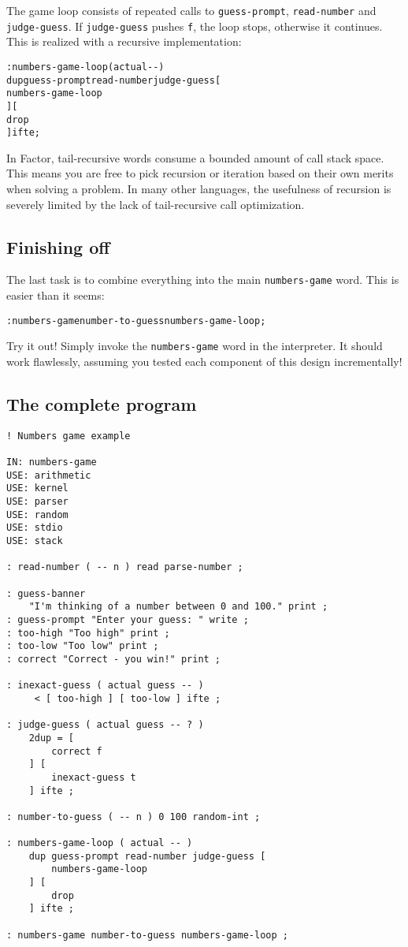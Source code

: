 \documentclass[english]{article}
\begin{document}
The game loop consists of repeated calls to \texttt{guess-prompt},
\texttt{read-number} and \texttt{judge-guess}. If \texttt{judge-guess}
pushes \texttt{f}, the loop stops, otherwise it continues. This is
realized with a recursive implementation:

\begin{alltt}
: numbers-game-loop ( actual -{}- )
    dup guess-prompt read-number judge-guess {[}
        numbers-game-loop
    {]} {[}
        drop
    {]} ifte ;
\end{alltt}
In Factor, tail-recursive words consume a bounded amount of call stack
space. This means you are free to pick recursion or iteration based
on their own merits when solving a problem. In many other languages,
the usefulness of recursion is severely limited by the lack of tail-recursive
call optimization.


\subsection{Finishing off}

The last task is to combine everything into the main \texttt{numbers-game}
word. This is easier than it seems:

\begin{alltt}
: numbers-game number-to-guess numbers-game-loop ;
\end{alltt}
Try it out! Simply invoke the \texttt{numbers-game} word in the interpreter.
It should work flawlessly, assuming you tested each component of this
design incrementally!


\subsection{The complete program}

\begin{verbatim}
! Numbers game example

IN: numbers-game
USE: arithmetic
USE: kernel
USE: parser
USE: random
USE: stdio
USE: stack

: read-number ( -- n ) read parse-number ;

: guess-banner
    "I'm thinking of a number between 0 and 100." print ;
: guess-prompt "Enter your guess: " write ;
: too-high "Too high" print ;
: too-low "Too low" print ;
: correct "Correct - you win!" print ;

: inexact-guess ( actual guess -- )
     < [ too-high ] [ too-low ] ifte ;

: judge-guess ( actual guess -- ? )
    2dup = [
        correct f
    ] [
        inexact-guess t
    ] ifte ;

: number-to-guess ( -- n ) 0 100 random-int ;

: numbers-game-loop ( actual -- )
    dup guess-prompt read-number judge-guess [
        numbers-game-loop
    ] [
        drop
    ] ifte ;

: numbers-game number-to-guess numbers-game-loop ;
\end{verbatim}
\end{document}
